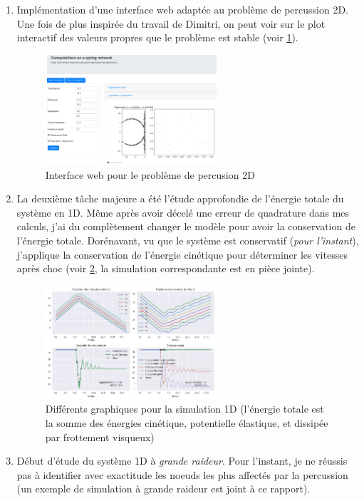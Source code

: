 \documentclass[
  french,
	11pt, %
]{fphw}
\begin{document}
\begin{enumerate}
  \item Implémentation d'une interface web adaptée au problème de percussion 2D. Une fois de plus inspirée du travail de Dimitri, on peut voir sur le plot interactif des valeurs propres que le problème est stable (voir \cref{fig:myfig}). 
  \begin{figure}[H]
    \centering
    \includegraphics[width=0.60\textwidth]{WebInterface.png}
    \caption{Interface web pour le problème de percusion 2D}
    \label{fig:myfig}
  \end{figure}
  \item La deuxième tâche majeure a été l'étude approfondie de l'énergie totale du système en 1D. Même après avoir décelé une erreur de quadrature dans mes calculs, j'ai du complètement changer le modèle pour avoir la conservation de l'énergie totale. Dorénavant, vu que le système est conservatif (\emph{pour l'instant}), j'applique la conservation de l'énergie cinétique pour déterminer les vitesses après choc (voir \cref{fig:myfig2}, la simulation correspondante est en pièce jointe). 
  \begin{figure}[h]
    \centering
    \includegraphics[width=0.60\textwidth]{ImageTot1D.png}
    \caption{Différents graphiques pour la simulation 1D (l'énergie totale est la somme des énergies cinétique, potentielle élastique, et dissipée par frottement visqueux)}
    \label{fig:myfig2}
  \end{figure}
  \item Début d'étude du système 1D à \emph{grande raideur}. Pour l'instant, je ne réussis pas à identifier avec exactitude les noeuds les plus affectés par la percussion (un exemple de simulation à grande raideur est joint à ce rapport).
\end{enumerate}
\end{document}
